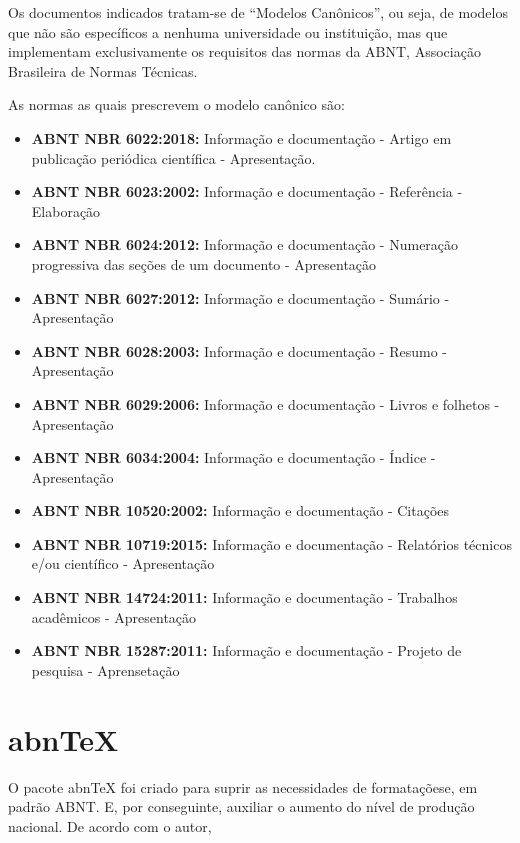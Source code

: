 \documentclass[
	12pt,				%
	openright,			%
	oneside,			%
	a4paper,			%
        brazil,				%
	]{abntex2}
\begin{document}
\begin{citacao}
Os documentos indicados tratam-se de “Modelos Canônicos”, ou seja,
de modelos que não são específicos a nenhuma universidade ou instituição, mas
que implementam exclusivamente os requisitos das normas da ABNT, Associação
Brasileira de Normas Técnicas. \cite[Cap. 1]{araujoclasse}
\end{citacao}

As normas as quais prescrevem o modelo canônico são:

\begin{itemize}
  \item \textbf{ABNT NBR 6022:2018:} Informação e documentação -
    Artigo em publicação periódica científica - Apresentação.
  \item \textbf{ABNT NBR 6023:2002:} Informação e documentação -
    Referência - Elaboração
  \item \textbf{ABNT NBR 6024:2012:} Informação e documentação -
    Numeração progressiva das seções de um documento - Apresentação
  \item \textbf{ABNT NBR 6027:2012:} Informação e documentação -
    Sumário - Apresentação
  \item \textbf{ABNT NBR 6028:2003:} Informação e documentação -
    Resumo - Apresentação
    \item \textbf{ABNT NBR 6029:2006:} Informação e documentação -
      Livros e folhetos - Apresentação
    \item \textbf{ABNT NBR 6034:2004:} Informação e documentação -
      Índice - Apresentação
    \item \textbf{ABNT NBR 10520:2002:} Informação e documentação -
      Citações
    \item \textbf{ABNT NBR 10719:2015:} Informação e documentação -
      Relatórios técnicos e/ou científico - Apresentação
    \item \textbf{ABNT NBR 14724:2011:} Informação e documentação -
      Trabalhos acadêmicos - Apresentação
    \item \textbf{ABNT NBR 15287:2011:} Informação e documentação -
      Projeto de pesquisa - Aprensetação
\end{itemize}

\section{abnTeX}

O pacote abnTeX foi criado para suprir as necessidades de
formataçõese, em padrão ABNT. E, por conseguinte, auxiliar o aumento
do nível de produção nacional. De acordo com o autor,
\end{document}
